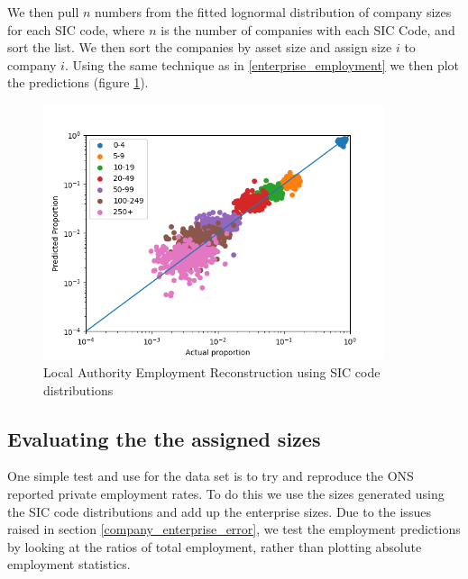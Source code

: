 \documentclass[a4paper,10pt]{article}
\begin{document}
   We then pull $n$ numbers from the fitted lognormal distribution of company sizes for each SIC code, where $n$ is the number of companies with each SIC Code, and sort the list. We then sort the companies by asset size and assign size $i$ to company $i$. Using the same technique as in \ref{enterprise_employment} we then plot the predictions (figure \ref{enterprise_employment_reconstruction_using_sic}).
  	\begin{figure}
      \begin{center}
         \includegraphics[width=10cm]{graphs/2014_la_reconstruction}
         \caption{Local Authority Employment Reconstruction using SIC code distributions}
         \label{enterprise_employment_reconstruction_using_sic}
      \end{center}
   \end{figure}


   \subsection{Evaluating the the assigned sizes}

   One simple test and use for the data set is to try and reproduce the ONS reported private employment rates. To do this we use the sizes generated using the SIC code distributions and add up the enterprise sizes. Due to the issues raised in section \ref{company_enterprise_error}, we test the employment predictions by looking at the ratios of total employment, rather than plotting absolute employment statistics.
\end{document}
